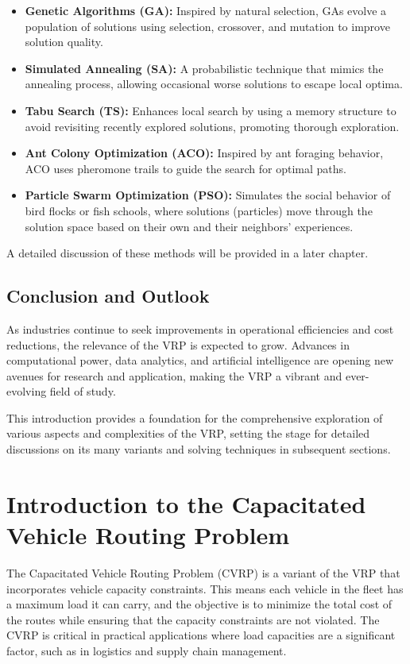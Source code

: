 \documentclass[
]{article}
\begin{document}
\begin{itemize}
  \item \textbf{Genetic Algorithms (GA):} Inspired by natural selection, GAs evolve a population of solutions using selection, crossover, and mutation to improve solution quality.
  \item \textbf{Simulated Annealing (SA):} A probabilistic technique that mimics the annealing process, allowing occasional worse solutions to escape local optima.
  \item \textbf{Tabu Search (TS):} Enhances local search by using a memory structure to avoid revisiting recently explored solutions, promoting thorough exploration.
  \item \textbf{Ant Colony Optimization (ACO):} Inspired by ant foraging behavior, ACO uses pheromone trails to guide the search for optimal paths.
  \item \textbf{Particle Swarm Optimization (PSO):} Simulates the social behavior of bird flocks or fish schools, where solutions (particles) move through the solution space based on their own and their neighbors' experiences.
\end{itemize}

A detailed discussion of these methods will be provided in a later chapter.




\subsection{Conclusion and Outlook}
As industries continue to seek improvements in operational efficiencies and cost reductions, the relevance of the VRP is expected to grow. Advances in computational power, data analytics, and artificial intelligence are opening new avenues for research and application, making the VRP a vibrant and ever-evolving field of study.

This introduction provides a foundation for the comprehensive exploration of various aspects and complexities of the VRP, setting the stage for detailed discussions on its many variants and solving techniques in subsequent sections.
\newpage

\section{Introduction to the Capacitated Vehicle Routing Problem}

The Capacitated Vehicle Routing Problem (CVRP) is a variant of the VRP that incorporates vehicle capacity constraints. This means each vehicle in the fleet has a maximum load it can carry, and the objective is to minimize the total cost of the routes while ensuring that the capacity constraints are not violated. The CVRP is critical in practical applications where load capacities are a significant factor, such as in logistics and supply chain management.
\end{document}
